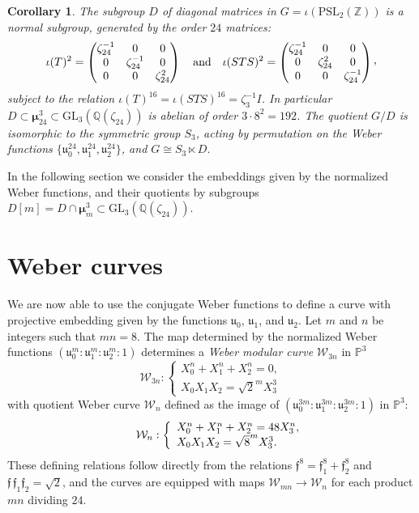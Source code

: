 \documentclass{amsart}
\newcommand{\cW}{\mathcal{W}}
\newcommand{\PP}{\mathbb{P}}
\newcommand{\QQ}{\mathbb{Q}}
\newcommand{\ZZ}{\mathbb{Z}}
\newcommand{\GL}{\mathrm{GL}}
\newcommand{\PSL}{\mathrm{PSL}}
\newcommand{\isom}{\cong}
\newcommand{\ff}{\mathfrak{f}}
\newcommand{\uu}{\mathfrak{u}}
\newcommand{\ccomma}{\raisebox{0.4ex}{,}}
\newcommand{\mmu}{\boldsymbol{\mu}}
\newtheorem{corollary}[theorem]{Corollary}
\begin{document}
\begin{corollary}
The subgroup $D$ of diagonal matrices in $G = \iota(\PSL_2(\ZZ))$ is a normal subgroup,
generated by the order $24$ matrices:
$$
\iota(T)^2
= \left(\begin{array}{@{}ccc@{}}
      \zeta_{24}^{-1}  &  0      &   0\\
         0  &   \zeta_{24}^{-1}  &   0\\
         0  &        0   & \zeta_{24}^{2}
\end{array}\right)
\quad\mbox{and}\quad
\iota(STS)^2 = \left(\begin{array}{@{}ccc@{}}
      \zeta_{24}^{-1}  &  0       &   0\\
         0 & \zeta_{24}^{2} &   0\\
         0        &  0   & \zeta_{24}^{-1}
\end{array}\right)\ccomma
$$
subject to the relation $\iota(T)^{16} = \iota(STS)^{16} = \zeta_3^{-1} I$.
In particular $D \subset \mmu_{24}^3 \subset \GL_3(\QQ(\zeta_{24}))$ is
abelian of order $3 \cdot 8^2 = 192$.  The quotient $G/D$ is isomorphic to
the symmetric group $S_3$, acting by permutation on the Weber functions
$\{\uu_0^{24},\uu_1^{24},\uu_2^{24}\}$, and $G \isom S_3 \ltimes D$.
\end{corollary}

In the following section we consider the embeddings given by the normalized Weber functions,
and their quotients by subgroups $D[m] = D \cap \mmu_m^3 \subset \GL_3(\QQ(\zeta_{24}))$.



\section{Weber curves}

We are now able to use the conjugate Weber functions to define a curve with
projective embedding given by the functions $\uu_0$, $\uu_1$, and $\uu_2$.
Let $m$ and $n$ be integers such that $mn = 8$.
The map determined by the normalized Weber functions $(\uu_0^m:\uu_1^m:\uu_2^m:1)$
determines a {\it Weber modular curve} $\cW_{3n}$ in $\PP^3$
\begin{equation}
  \label{eqn:weber3n}
\cW_{3n}: \left\{
\begin{array}{l}
  X_0^n + X_1^n + X_2^n = 0,\\
  X_0 X_1 X_2 = \sqrt{2}^m X_3^3
\end{array}\right.
\end{equation}
with quotient Weber curve $\cW_{n}$ defined
as the image of $(\uu_0^{3m}:\uu_1^{3m}:\uu_2^{3m}:1)$ in $\PP^3$:
\begin{equation}
  \label{eqn:weber1n}
\mbox{\hspace{6mm}}
\cW_{n}: \left\{
\begin{array}{l}
  X_0^n + X_1^n + X_2^n = 48 X_3^n,\\
  X_0 X_1 X_2 = \sqrt{8}^{m} X_3^3.
\end{array}\right.
\end{equation}
These defining relations follow directly from the relations $\ff^8 = \ff_1^8 + \ff_2^8$
and $\ff\,\ff_1\ff_2 = \sqrt{2}$, and the curves are equipped with maps
$\cW_{mn} \to \cW_{n}$ for each product $mn$ dividing $24$.
\end{document}
